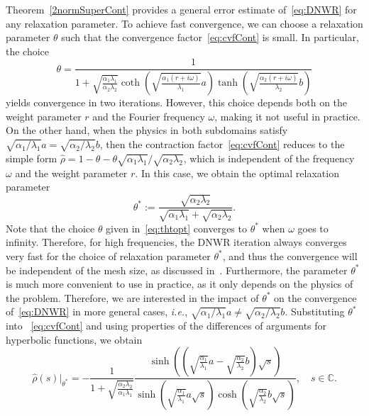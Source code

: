 \documentclass[10pt,a4paper]{amsart}
\begin{document}
Theorem~\ref{2normSuperCont} provides a general error estimate of~\eqref{eq:DNWR} for any relaxation parameter. To achieve fast convergence, we can choose a relaxation parameter $\theta$ such that the convergence factor~\eqref{eq:cvfCont} is small. In particular, the choice
\begin{equation}\label{eq:thtopt}
\theta = \frac1{1 + \sqrt{\frac{\alpha_1 \lambda_1}{\alpha_2 \lambda_2}}\coth\left(\sqrt{\frac{\alpha_1 (r+i \omega)}{\lambda_1}} a\right) \tanh\left(\sqrt{\frac{\alpha_2 (r+i \omega)}{\lambda_2}} b\right)}
\end{equation}
yields convergence in two iterations. However, this choice depends both on the weight parameter $r$ and the Fourier frequency $\omega$, making it not useful in practice. On the other hand, when the physics in both subdomains satisfy $\sqrt{\alpha_1/\lambda_1} a = \sqrt{\alpha_2/\lambda_2} b$, then the contraction factor~\eqref{eq:cvfCont} reduces to the simple form $\hat{\rho} = 1 - \theta - \theta\sqrt{\alpha_1 \lambda_1}/\sqrt{\alpha_2 \lambda_2}$, which is independent of the frequency $\omega$ and the weight parameter $r$. In this case, we obtain the optimal relaxation parameter
\begin{equation}\label{eq:thetaopt}
	\theta^* := \frac{\sqrt{\alpha_2\lambda_2}}{\sqrt{\alpha_1\lambda_1}+\sqrt{\alpha_2\lambda_2}}.
\end{equation}
Note that the choice $\theta$ given in~\eqref{eq:thtopt} converges to $\theta^*$ when $\omega$ goes to infinity.
Therefore, for high frequencies, the DNWR iteration always converges very fast for the choice of relaxation parameter $\theta^*$, and thus the convergence will be independent of the mesh size, as discussed in~\cite[Chapter 4.7, p.174]{Ciaramella2022}. 
Furthermore, the parameter $\theta^*$ is much more convenient to use in practice, as it only depends on the physics of the problem. Therefore, we are interested in the impact of $\theta^*$ on the convergence of~\eqref{eq:DNWR} in more general cases, {\it i.e.}, $\sqrt{\alpha_1/\lambda_1} a \neq \sqrt{\alpha_2/\lambda_2} b$. Substituting $\theta^*$ into ~\eqref{eq:cvfCont} and using properties of the differences of arguments for hyperbolic functions, we obtain
\begin{equation}\label{eq:rhotheta}
\hat{\rho}(s)|_{\theta^*} = -\frac{1}{1+\sqrt{\frac{\alpha_2\lambda_2}{\alpha_1\lambda_1}}}\frac{\sinh\left(\left(\sqrt{\frac{\alpha_1}{\lambda_1}} a - \sqrt{\frac{\alpha_2}{\lambda_2}} b\right) \sqrt{s}\right)}{\sinh\left(\sqrt{\frac{\alpha_1}{\lambda_1}} a\sqrt{s}\right)\cosh\left(\sqrt{\frac{\alpha_2}{\lambda_2}} b\sqrt{s}\right)},
\quad 
s \in \mathbb{C}.
\end{equation}
\end{document}
